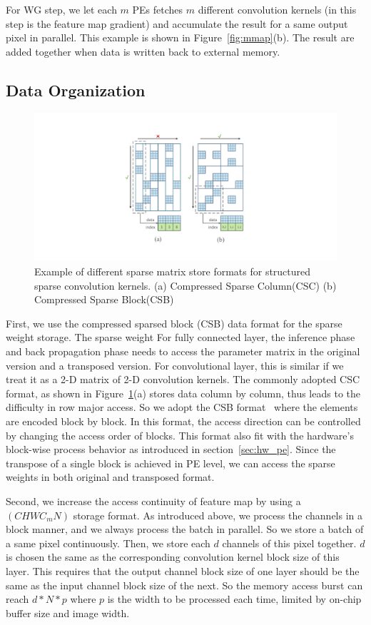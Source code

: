 For WG step, we let each $m$ PEs fetches $m$ different convolution kernels (in this step is the feature map gradient) and accumulate the result for a same output pixel in parallel. This example is shown in Figure~\ref{fig:mmap}(b). The result are added together when data is written back to external memory. 

\subsection{Data Organization}
\begin{figure}[htb]
  \centering
  \includegraphics[width=1.0\columnwidth]{figures/csb.pdf}
  \caption{Example of different sparse matrix store formats for structured sparse convolution kernels. (a) Compressed Sparse Column(CSC) (b) Compressed Sparse Block(CSB)}
  \label{fig:csb}
\end{figure}

First, we use the compressed sparsed block (CSB) data format for the sparse weight storage. The sparse weight For fully connected layer, the inference phase and back propagation phase needs to access the parameter matrix in the original version and a transposed version. For convolutional layer, this is similar if we treat it as a 2-D matrix of 2-D convolution kernels. The commonly adopted CSC format, as shown in Figure~\ref{fig:csb}(a) stores data column by column, thus leads to the difficulty in row major access. So we adopt the CSB format~\cite{bulucc2009parallel} where the elements are encoded block by block. In this format, the access direction can be controlled by changing the access order of blocks. This format also fit with the hardware's block-wise process behavior as introduced in section~\ref{sec:hw_pe}. Since the transpose of a single block is achieved in PE level, we can access the sparse weights in both original and transposed format.

Second, we increase the access continuity of feature map by using a $(CHWC_mN)$ storage format. As introduced above, we process the channels in a block manner, and we always process the batch in parallel. So we store a batch of a same pixel continuously. Then, we store each $d$ channels of this pixel together.  $d$ is chosen the same as the corresponding convolution kernel block size of this layer. This requires that the output channel block size of one layer should be the same as the input channel block size of the next. So the memory access burst can reach $d*N*p$ where $p$ is the width to be processed each time, limited by on-chip buffer size and image width. 

